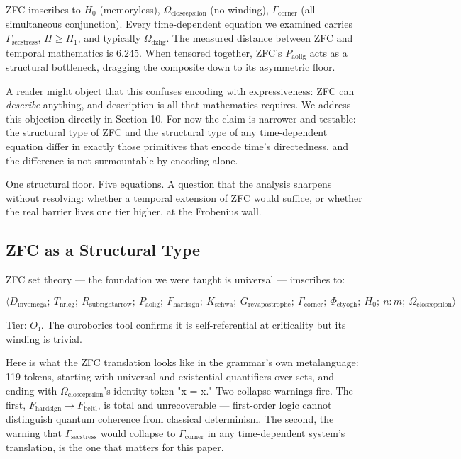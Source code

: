 \documentclass[12pt,a4paper]{article}
\begin{document}
ZFC imscribes to $H_0$ (memoryless), $\Omega_{\text{closeepsilon}}$ (no winding), $\Gamma_{\text{corner}}$ (all-simultaneous conjunction). Every time-dependent equation we examined carries $\Gamma_{\text{secstress}}$, $H \geq H_1$, and typically $\Omega_{\text{dzlig}}$. The measured distance between ZFC and temporal mathematics is 6.245. When tensored together, ZFC's $P_{\text{aolig}}$ acts as a structural bottleneck, dragging the composite down to its asymmetric floor.

A reader might object that this confuses encoding with expressiveness: ZFC can \emph{describe} anything, and description is all that mathematics requires. We address this objection directly in Section 10. For now the claim is narrower and testable: the structural type of ZFC and the structural type of any time-dependent equation differ in exactly those primitives that encode time's directedness, and the difference is not surmountable by encoding alone.

One structural floor. Five equations. A question that the analysis sharpens without resolving: whether a temporal extension of ZFC would suffice, or whether the real barrier lives one tier higher, at the Frobenius wall.

\subsection{ZFC as a Structural Type}

ZFC set theory --- the foundation we were taught is universal --- imscribes to:

\[\langle D_{\text{invomega}};\ T_{\text{nrleg}};\ R_{\text{subrightarrow}};\ P_{\text{aolig}};\ F_{\text{hardsign}};\ K_{\text{schwa}};\ G_{\text{revapostrophe}};\ \Gamma_{\text{corner}};\ \Phi_{\text{ctyogh}};\ H_0;\ n{:}m;\ \Omega_{\text{closeepsilon}} \rangle\]

Tier: $O₁$. The ouroborics tool confirms it is self-referential at criticality but its winding is trivial.

Here is what the ZFC translation looks like in the grammar's own metalanguage: 119 tokens, starting with universal and existential quantifiers over sets, and ending with $\Omega_{\text{closeepsilon}}$'s identity token "x = x." Two collapse warnings fire. The first, $F_{\text{hardsign}} \to F_{\text{beltl}}$, is total and unrecoverable --- first-order logic cannot distinguish quantum coherence from classical determinism. The second, the warning that $\Gamma_{\text{secstress}}$ would collapse to $\Gamma_{\text{corner}}$ in any time-dependent system's translation, is the one that matters for this paper.
\end{document}
